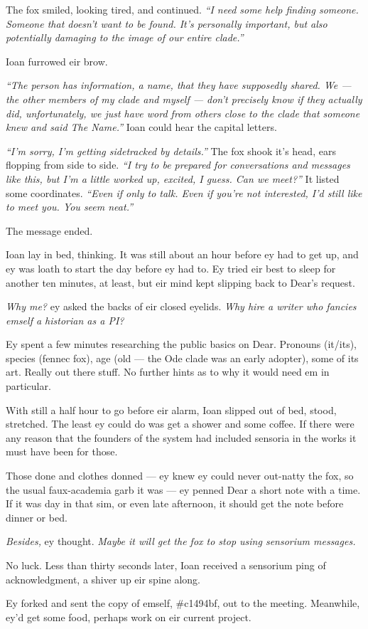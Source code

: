 The fox smiled, looking tired, and continued. \emph{``I need some help finding someone. Someone that doesn't want to be found. It's personally important, but also potentially damaging to the image of our entire clade.''}

Ioan furrowed eir brow.

\emph{``The person has information, a name, that they have supposedly shared. We — the other members of my clade and myself — don't precisely know if they actually did, unfortunately, we just have word from others close to the clade that someone knew and said The Name.''} Ioan could hear the capital letters.

\emph{``I'm sorry, I'm getting sidetracked by details.''} The fox shook it's head, ears flopping from side to side. \emph{``I try to be prepared for conversations and messages like this, but I'm a little worked up, excited, I guess. Can we meet?''} It listed some coordinates. \emph{``Even if only to talk. Even if you're not interested, I'd still like to meet you. You seem neat.''}

The message ended.

Ioan lay in bed, thinking. It was still about an hour before ey had to get up, and ey was loath to start the day before ey had to. Ey tried eir best to sleep for another ten minutes, at least, but eir mind kept slipping back to Dear's request.

\emph{Why me?} ey asked the backs of eir closed eyelids. \emph{Why hire a writer who fancies emself a historian as a PI?}

Ey spent a few minutes researching the public basics on Dear. Pronouns (it/its), species (fennec fox), age (old — the Ode clade was an early adopter), some of its art. Really out there stuff. No further hints as to why it would need em in particular.

With still a half hour to go before eir alarm, Ioan slipped out of bed, stood, stretched. The least ey could do was get a shower and some coffee. If there were any reason that the founders of the system had included sensoria in the works it must have been for those.

Those done and clothes donned — ey knew ey could never out-natty the fox, so the usual faux-academia garb it was — ey penned Dear a short note with a time. If it was day in that sim, or even late afternoon, it should get the note before dinner or bed.

\emph{Besides,} ey thought. \emph{Maybe it will get the fox to stop using sensorium messages.}

No luck. Less than thirty seconds later, Ioan received a sensorium ping of acknowledgment, a shiver up eir spine along.

Ey forked and sent the copy of emself, \#c1494bf, out to the meeting. Meanwhile, ey'd get some food, perhaps work on eir current project.

